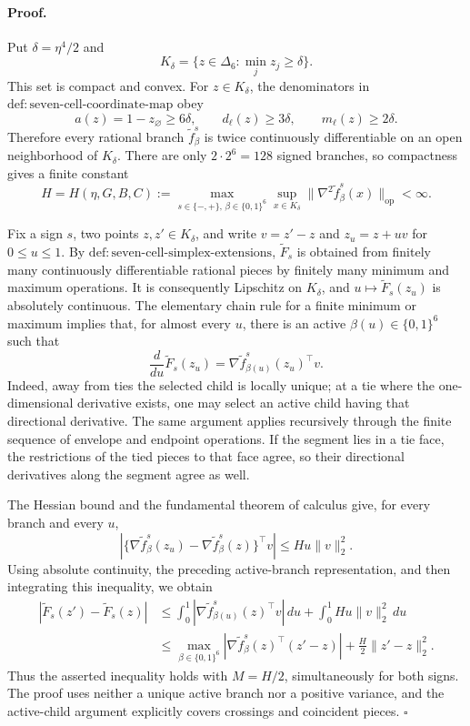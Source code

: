 \paragraph{Proof.}
Put \(\delta=\eta^4/2\) and
\[
 K_\delta=\{z\in\Delta_6:\min_j z_j\geq\delta\}.
\]
This set is compact and convex.  For \(z\in K_\delta\), the denominators in \(\mathrm{def{:}seven\text{-}cell\text{-}coordinate\text{-}map}\) obey
\[
 a(z)=1-z_\varnothing\geq6\delta,
 \qquad
 d_\ell(z)\geq3\delta,
 \qquad
 m_\ell(z)\geq2\delta.
\]
Therefore every rational branch \(\widetilde f_\beta^s\) is twice continuously differentiable on an open neighborhood of \(K_\delta\).  There are only \(2\cdot2^6=128\) signed branches, so compactness gives a finite constant
\[
 H=H(\eta,G,B,C)
 :=\max_{s\in\{-,+\},\,\beta\in\{0,1\}^6}
 \sup_{x\in K_\delta}
 \bigl\|\nabla^2\widetilde f_\beta^s(x)\bigr\|_{\mathrm{op}}<\infty.
\]

Fix a sign \(s\), two points \(z,z'\in K_\delta\), and write \(v=z'-z\) and \(z_u=z+uv\) for \(0\leq u\leq1\).  By \(\mathrm{def{:}seven\text{-}cell\text{-}simplex\text{-}extensions}\), \(\widetilde F_s\) is obtained from finitely many continuously differentiable rational pieces by finitely many minimum and maximum operations.  It is consequently Lipschitz on \(K_\delta\), and \(u\mapsto\widetilde F_s(z_u)\) is absolutely continuous.  The elementary chain rule for a finite minimum or maximum implies that, for almost every \(u\), there is an active \(\beta(u)\in\{0,1\}^6\) such that
\[
 \frac{d}{du}\widetilde F_s(z_u)
 =\nabla\widetilde f_{\beta(u)}^s(z_u)^\top v.
\]
Indeed, away from ties the selected child is locally unique; at a tie where the one-dimensional derivative exists, one may select an active child having that directional derivative.  The same argument applies recursively through the finite sequence of envelope and endpoint operations.  If the segment lies in a tie face, the restrictions of the tied pieces to that face agree, so their directional derivatives along the segment agree as well.

The Hessian bound and the fundamental theorem of calculus give, for every branch and every \(u\),
\[
 \left|
 \{\nabla\widetilde f_\beta^s(z_u)-\nabla\widetilde f_\beta^s(z)\}^\top v
 \right|
 \leq Hu\|v\|_2^2.
\]
Using absolute continuity, the preceding active-branch representation, and then integrating this inequality, we obtain
\[
 \begin{aligned}
 \left|\widetilde F_s(z')-\widetilde F_s(z)\right|
 &\leq
 \int_0^1
 \left|\nabla\widetilde f_{\beta(u)}^s(z)^\top v\right|\,du
 +\int_0^1Hu\|v\|_2^2\,du\\
 &\leq
 \max_{\beta\in\{0,1\}^6}
 \left|\nabla\widetilde f_\beta^s(z)^\top(z'-z)\right|
 +\frac H2\|z'-z\|_2^2.
 \end{aligned}
\]
Thus the asserted inequality holds with \(M=H/2\), simultaneously for both signs.  The proof uses neither a unique active branch nor a positive variance, and the active-child argument explicitly covers crossings and coincident pieces. \(\square\)

